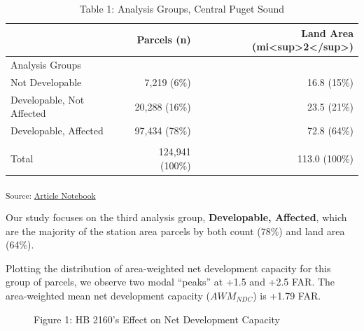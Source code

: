 \documentclass[
]{agujournal2019}
\begin{document}
\begin{longtable}{l|rr}

\caption{\label{tbl-results-summary-table}Table 1: Analysis Groups,
Central Puget Sound}

\tabularnewline

\toprule
\multicolumn{1}{l}{} & Parcels (n) & Land Area (mi<sup>2</sup>) \\ 
\midrule
\multicolumn{3}{l}{Analysis Groups} \\ 
\midrule
Not Developable & 7,219   (6\%) & 16.8  (15\%) \\ 
Developable, Not Affected & 20,288  (16\%) & 23.5  (21\%) \\ 
Developable, Affected & 97,434  (78\%) & 72.8  (64\%) \\ 
\midrule
\multicolumn{3}{l}{\vspace*{-5mm}} \\ 
Total & 124,941 (100\%) & 113.0 (100\%) \\ 
\bottomrule

\end{longtable}

\textsubscript{Source:
\href{https://tiernanmartin.github.io/2024-transit-oriented-development-bill/index.qmd.html}{Article
Notebook}}

Our study focuses on the third analysis group, \textbf{Developable,
Affected}, which are the majority of the station area parcels by both
count (78\%) and land area (64\%).

Plotting the distribution of area-weighted net development capacity for
this group of parcels, we observe two modal ``peaks'' at +1.5 and +2.5
FAR. The area-weighted mean net development capacity (\(AWM_{NDC}\)) is
+1.79 FAR.

\label{cell-fig-results-histogram-affected}
\begin{figure}[H]


\caption{\label{fig-results-histogram-affected}Figure 1: HB 2160's
Effect on Net Development Capacity}

\end{figure}%
\end{document}
